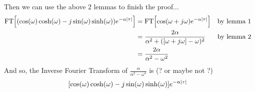 Then we can use the above 2 lemmas to finish the proof...
\begin{align*}
\mathrm{FT}{\left[{\left(\cos(\omega)\cosh(\omega)-j\sin(\omega)\sinh(\omega)\right)}e^{-\alpha{\left\lvert \tau \right\rvert}}\right]}
  &= \mathrm{FT}{\left[\cos(\omega+j\omega) e^{-\alpha{\left\lvert \tau \right\rvert}}\right]}
  && \text{by lemma 1}
  \\&= \frac{2\alpha}{\alpha^2+([\omega+j\omega]-\omega)^2}
  && \text{by lemma 2}
  \\&= \frac{2\alpha}{\alpha^2-\omega^2}
\end{align*}
And so, the Inverse Fourier Transform of $\frac{\alpha}{\alpha^2-\omega^2}$ is (? or maybe not ?)
$${\left[\cos(\omega)\cosh(\omega)-j\sin(\omega)\sinh(\omega)\right]}e^{-\alpha{\left\lvert \tau \right\rvert}}$$
